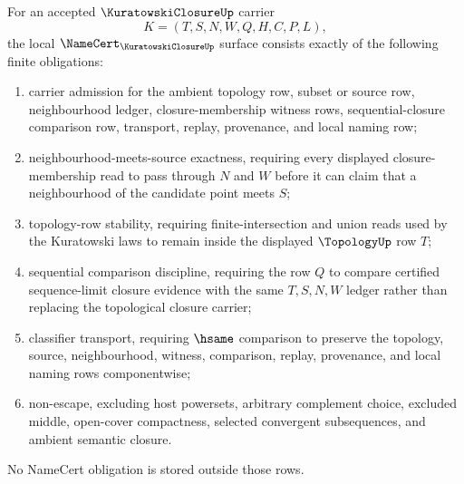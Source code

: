 \begin{theorem}
\label{thm:kuratowski-closure-namecert-obligations}
For an accepted $\KuratowskiClosureUp$ carrier
$$
K=(T,S,N,W,Q,H,C,P,L),
$$
the local $\NameCert_{\KuratowskiClosureUp}$ surface consists exactly of the following finite obligations:
\begin{enumerate}
\item carrier admission for the ambient topology row, subset or source row, neighbourhood ledger, closure-membership witness rows, sequential-closure comparison row, transport, replay, provenance, and local naming row;
\item neighbourhood-meets-source exactness, requiring every displayed closure-membership read to pass through $N$ and $W$ before it can claim that a neighbourhood of the candidate point meets $S$;
\item topology-row stability, requiring finite-intersection and union reads used by the Kuratowski laws to remain inside the displayed $\TopologyUp$ row $T$;
\item sequential comparison discipline, requiring the row $Q$ to compare certified sequence-limit closure evidence with the same $T,S,N,W$ ledger rather than replacing the topological closure carrier;
\item classifier transport, requiring $\hsame$ comparison to preserve the topology, source, neighbourhood, witness, comparison, replay, provenance, and local naming rows componentwise;
\item non-escape, excluding host powersets, arbitrary complement choice, excluded middle, open-cover compactness, selected convergent subsequences, and ambient semantic closure.
\end{enumerate}
No NameCert obligation is stored outside those rows.
\end{theorem}
